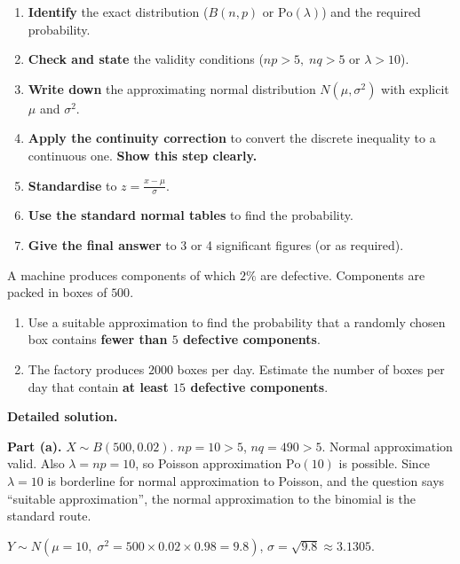 \documentclass[11pt]{article}
\begin{document}
\begin{aretenir}
\begin{enumerate}
\item \textbf{Identify} the exact distribution ($B(n,p)$ or $\text{Po}(\lambda)$) and the required probability.
\item \textbf{Check and state} the validity conditions ($np>5,\;nq>5$ or $\lambda>10$).
\item \textbf{Write down} the approximating normal distribution $N(\mu,\sigma^2)$ with explicit $\mu$ and $\sigma^2$.
\item \textbf{Apply the continuity correction} to convert the discrete inequality to a continuous one. \textbf{Show this step clearly.}
\item \textbf{Standardise} to $z = \frac{x - \mu}{\sigma}$.
\item \textbf{Use the standard normal tables} to find the probability.
\item \textbf{Give the final answer} to 3 or 4 significant figures (or as required).
\end{enumerate}
\end{aretenir}

\begin{exoresolu}
A machine produces components of which $2\%$ are defective. Components are packed in boxes of $500$.
\begin{enumerate}
\item Use a suitable approximation to find the probability that a randomly chosen box contains \textbf{fewer than $5$ defective components}.
\item The factory produces $2000$ boxes per day. Estimate the number of boxes per day that contain \textbf{at least $15$ defective components}.
\end{enumerate}
\end{exoresolu}

\textbf{Detailed solution.}

\textbf{Part (a).}
$X \sim B(500, 0.02)$. $np = 10 > 5$, $nq = 490 > 5$. Normal approximation valid.
Also $\lambda = np = 10$, so Poisson approximation $\text{Po}(10)$ is possible. Since $\lambda = 10$ is borderline for normal approximation to Poisson, and the question says ``suitable approximation'', the normal approximation to the binomial is the standard route.

$Y \sim N(\mu = 10,\; \sigma^2 = 500 \times 0.02 \times 0.98 = 9.8)$, $\sigma = \sqrt{9.8} \approx 3.1305$.
\end{document}
